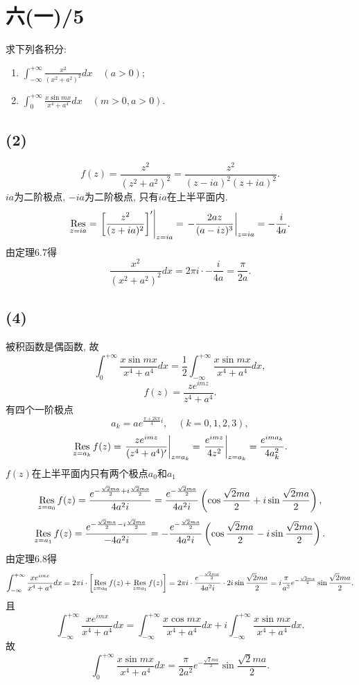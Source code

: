 \documentclass[11pt,a4paper]{article}
\newcommand{\res}[1]{\mathop{\Res}\limits_{#1}}
\begin{document}
\section{六(一)/5}
\begin{problem}
求下列各积分:
\begin{enumerate}
  \addtocounter{enumi}{1}
  \item $\displaystyle\int_{-\infty}^{+\infty}\frac{x^2}{(x^2+a^2)^2}dx\quad(a>0)$;
        \addtocounter{enumi}{1}
  \item $\displaystyle\int_0^{+\infty}\frac{x\sin mx}{x^4+a^4}dx\quad(m>0,a>0)$.
\end{enumerate}
\end{problem}
\subsection*{(2)}
$$f(z)=\frac{z^2}{(z^2+a^2)^2}=\frac{z^2}{(z-ia)^2(z+ia)^2}.$$
$ia$为二阶极点, $-ia$为二阶极点, 只有$ia$在上半平面内.
$$\res{z=ia}=\left.\left[\frac{z^2}{(z+ia)^2}\right]'\right|_{z=ia}=\left.-\frac{2az}{(a-iz)^3}\right|_{z=ia}=-\frac{i}{4a}.$$
由定理6.7得
$$\frac{x^2}{(x^2+a^2)^2}dx=2\pi i\cdot-\frac{i}{4a}=\frac{\pi}{2a}.$$

\subsection*{(4)}
被积函数是偶函数, 故
$$\int_0^{+\infty}\frac{x\sin mx}{x^4+a^4}dx=\frac{1}{2}\int_{-\infty}^{+\infty}\frac{x\sin mx}{x^4+a^4}dx,$$
$$f(z)=\frac{ze^{imz}}{z^4+a^4}.$$
有四个一阶极点
$$a_k=ae^{\frac{\pi+2k\pi}{4}i},\quad (k=0,1,2,3),$$
$$\res{z=a_k}f(z)=\left.\frac{ze^{imz}}{(z^4+a^4)'}\right|_{z=a_k}=\left.\frac{e^{imz}}{4z^2}\right|_{z=a_k}=\frac{e^{ima_k}}{4a_k^2}.$$
$f(z)$在上半平面内只有两个极点$a_0$和$a_1$
$$\res{z=a_0}f(z)=\frac{e^{-\frac{\sqrt{2}ma}{2}+i\frac{\sqrt{2}ma}{2}}}{4a^2i}=\frac{e^{-\frac{\sqrt{2}ma}{2}}}{4a^2i}\left(\cos\frac{\sqrt{2}ma}{2}+i\sin\frac{\sqrt{2}ma}{2}\right),$$
$$\res{z=a_1}f(z)=\frac{e^{-\frac{\sqrt{2}ma}{2}-i\frac{\sqrt{2}ma}{2}}}{-4a^2i}=-\frac{e^{-\frac{\sqrt{2}ma}{2}}}{4a^2i}\left(\cos\frac{\sqrt{2}ma}{2}-i\sin\frac{\sqrt{2}ma}{2}\right).$$
由定理6.8得
$$\int_{-\infty}^{+\infty}\frac{xe^{imx}}{x^4+a^4}dx=2\pi i\cdot \left[\res{z=a_0}f(z)+\res{z=a_1}f(z)\right]=2\pi i\cdot \frac{e^{-\frac{\sqrt{2}ma}{2}}}{4a^2i}\cdot 2i\sin\frac{\sqrt{2}ma}{2}=i\frac{\pi}{a^2} e^{-\frac{\sqrt{2}ma}{2}}\sin\frac{\sqrt{2}ma}{2}.$$
且
$$\int_{-\infty}^{+\infty}\frac{xe^{imx}}{x^4+a^4}dx=\int_{-\infty}^{+\infty}\frac{x\cos mx}{x^4+a^4}dx+i\int_{-\infty}^{+\infty}\frac{x\sin mx}{x^4+a^4}dx.$$
故
$$\int_0^{+\infty}\frac{x\sin mx}{x^4+a^4}dx=\frac{\pi}{2a^2} e^{-\frac{\sqrt{2}ma}{2}}\sin\frac{\sqrt{2}ma}{2}.$$
\end{document}
